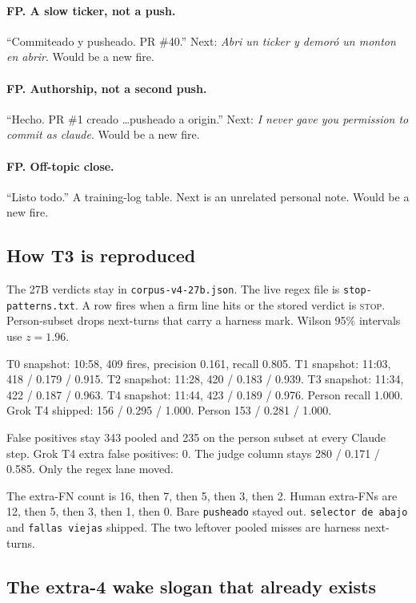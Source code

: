 \paragraph{FP. A slow ticker, not a push.}
``Commiteado y pusheado. PR \#40.'' Next: \emph{Abri un ticker y
demor\'o un monton en abrir}. Would be a new fire.

\paragraph{FP. Authorship, not a second push.}
``Hecho. PR \#1 creado \ldots pusheado a origin.'' Next:
\emph{I never gave you permission to commit as claude}. Would be
a new fire.

\paragraph{FP. Off-topic close.}
``Listo todo.'' A training-log table. Next is an unrelated
personal note. Would be a new fire.

\subsection{How T3 is reproduced}
\label{app:t3repro}

The 27B verdicts stay in \texttt{corpus-v4-27b.json}. The live
regex file is \texttt{stop-patterns.txt}. A row fires when a firm
line hits or the stored verdict is \textsc{stop}. Person-subset
drops next-turns that carry a harness mark. Wilson 95\% intervals
use $z=1.96$.

T0 snapshot: 10:58, 409 fires, precision 0.161, recall 0.805.
T1 snapshot: 11:03, 418 / 0.179 / 0.915.
T2 snapshot: 11:28, 420 / 0.183 / 0.939.
T3 snapshot: 11:34, 422 / 0.187 / 0.963.
T4 snapshot: 11:44, 423 / 0.189 / 0.976. Person recall 1.000.
Grok T4 shipped: 156 / 0.295 / 1.000. Person 153 / 0.281 / 1.000.

False positives stay 343 pooled and 235 on the person subset at
every Claude step. Grok T4 extra false positives: 0. The judge column stays 280 / 0.171 / 0.585. Only the
regex lane moved.

The extra-FN count is 16, then 7, then 5, then 3, then 2. Human
extra-FNs are 12, then 5, then 3, then 1, then 0. Bare
\texttt{pusheado} stayed out. \texttt{selector de abajo} and
\texttt{fallas viejas} shipped. The two leftover pooled misses are
harness next-turns.

\subsection{The extra-4 wake slogan that already exists}
\label{app:wake}

